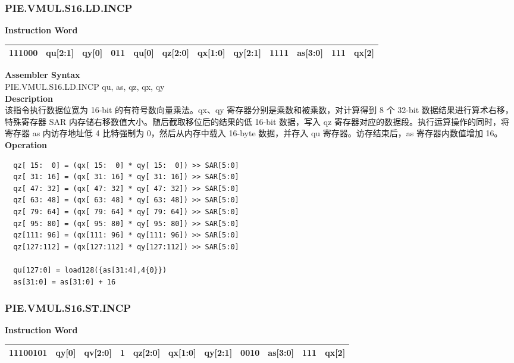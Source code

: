 \newpage
\subsubsection{PIE.VMUL.S16.LD.INCP}\label{instruction:PIEVMULS16LDINCP}
\setlength\tabcolsep{6pt}
\textbf{Instruction Word} \\
\begin{tabular}{|c|c|c|c|c|c|c|c|c|c|c|c|}
	\hline
	111000 & qu[2:1] & qy[0] & 011 & qu[0] & qz[2:0] & qx[1:0] & qy[2:1] & 1111 & as[3:0] & 111 & qx[2] \\
	\hline
\end{tabular}

\textbf{Assembler Syntax} \\
PIE.VMUL.S16.LD.INCP qu, as, qz, qx, qy \\
\textbf{Description} \\
该指令执行数据位宽为 16-bit 的有符号数向量乘法。qx、qy 寄存器分别是乘数和被乘数，对计算得到 8 个 32-bit 数据结果进行算术右移，特殊寄存器 SAR 内存储右移数值大小。随后截取移位后的结果的低 16-bit 数据，写入 qz 寄存器对应的数据段。执行运算操作的同时，将寄存器 as 内访存地址低 4 比特强制为 0，然后从内存中载入 16-byte 数据，并存入 qu 寄存器。访存结束后，as 寄存器内数值增加 16。\\
\textbf{Operation}
\begin{lstlisting}
  qz[ 15:  0] = (qx[ 15:  0] * qy[ 15:  0]) >> SAR[5:0]
  qz[ 31: 16] = (qx[ 31: 16] * qy[ 31: 16]) >> SAR[5:0]
  qz[ 47: 32] = (qx[ 47: 32] * qy[ 47: 32]) >> SAR[5:0]
  qz[ 63: 48] = (qx[ 63: 48] * qy[ 63: 48]) >> SAR[5:0]
  qz[ 79: 64] = (qx[ 79: 64] * qy[ 79: 64]) >> SAR[5:0]
  qz[ 95: 80] = (qx[ 95: 80] * qy[ 95: 80]) >> SAR[5:0]
  qz[111: 96] = (qx[111: 96] * qy[111: 96]) >> SAR[5:0]
  qz[127:112] = (qx[127:112] * qy[127:112]) >> SAR[5:0]

  qu[127:0] = load128({as[31:4],4{0}})
  as[31:0] = as[31:0] + 16
\end{lstlisting}

\newpage
\subsubsection{PIE.VMUL.S16.ST.INCP}\label{instruction:PIEVMULS16STINCP}
\setlength\tabcolsep{6pt}
\textbf{Instruction Word} \\
\begin{tabular}{|c|c|c|c|c|c|c|c|c|c|c|}
	\hline
	11100101 & qy[0] & qv[2:0] & 1 & qz[2:0] & qx[1:0] & qy[2:1] & 0010 & as[3:0] & 111 & qx[2] \\
	\hline
\end{tabular}

